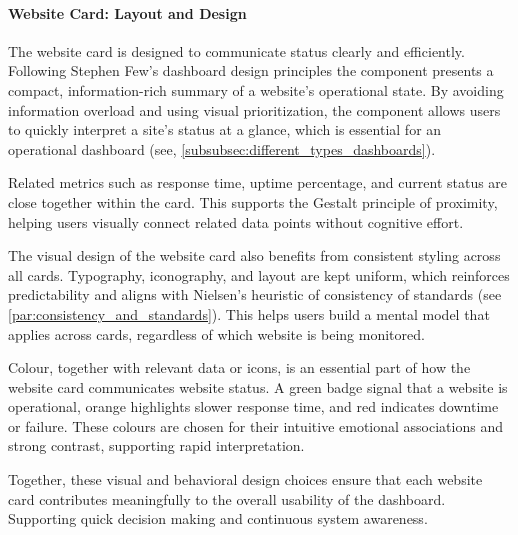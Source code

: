 \paragraph{Website Card: Layout and Design}
\label{par:website_card_design}

The website card is designed to communicate status clearly and efficiently. Following Stephen Few's dashboard design principles the component presents a compact, information-rich summary of a website's operational state. By avoiding information overload and using visual prioritization, the component allows users to quickly interpret a site's status at a glance, which is essential for an operational dashboard (see, \ref{subsubsec:different_types_dashboards}). 

Related metrics such as response time, uptime percentage, and current status are close together within the card. This supports the Gestalt principle of proximity, helping users visually connect related data points without cognitive effort. 

The visual design of the website card also benefits from consistent styling across all cards. Typography, iconography, and layout are kept uniform, which reinforces predictability and aligns with Nielsen's heuristic of consistency of standards (see \ref{par:consistency_and_standards}). This helps users build a mental model that applies across cards, regardless of which website is being monitored. 

Colour, together with relevant data or icons, is an essential part of how the website card communicates website status. A green badge signal that a website is operational, orange highlights slower response time, and red indicates downtime or failure. These colours are chosen for their intuitive emotional associations and strong contrast, supporting rapid interpretation. 

Together, these visual and behavioral design choices ensure that each website card contributes meaningfully to the overall usability of the dashboard. Supporting quick decision making and continuous system awareness.

